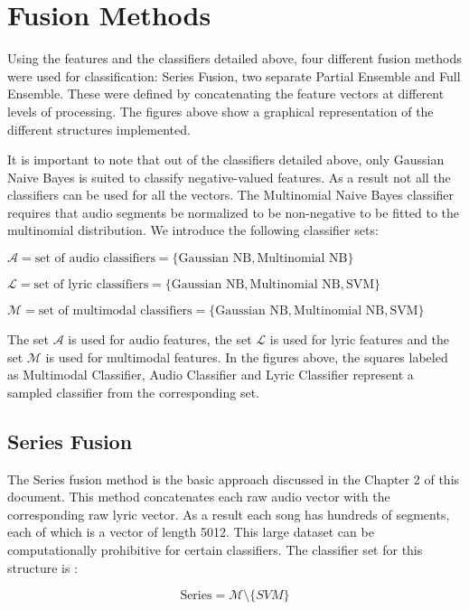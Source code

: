 \section{Fusion Methods}

Using the features and the classifiers detailed above, four different fusion methods were used for 
classification: Series Fusion, two separate Partial Ensemble and Full Ensemble. These were defined by
concatenating the feature vectors at different levels of processing.  The figures above show a graphical 
representation of the different structures implemented.  

It is important to note that out of the classifiers detailed above, only Gaussian Naive Bayes is suited to classify 
negative-valued features. As a result not all the classifiers can be used for all the vectors.   The Multinomial Naive Bayes
classifier requires that audio segments be normalized to be non-negative to be fitted to the multinomial distribution. We introduce the
following classifier sets:

$ \mathcal{A} = \text{set of audio classifiers} = \{ \text{Gaussian NB}, \text{Multinomial NB}\} $

$ \mathcal{L} = \text{set of lyric classifiers} = \{ \text{Gaussian NB}, \text{Multinomial NB}, \text{SVM}\} $

$ \mathcal{M} = \text{set of multimodal classifiers} = \{\text{Gaussian NB}, \text{Multinomial NB}, \text{SVM}\} $


The set $\mathcal{A} $ is used for audio features, the set $\mathcal{L}$ is used 
for lyric features and the set $\mathcal{M}$ is used for multimodal features.  In the figures above, the squares labeled as
Multimodal Classifier, Audio Classifier and Lyric Classifier represent a sampled classifier from the corresponding set.

\subsection{Series Fusion}

The Series fusion method is the basic approach discussed in the Chapter 2 of this document. This
method concatenates each raw audio vector with the corresponding raw lyric vector. As a result each song has hundreds of segments,
each of which is a vector of length 5012.  This large dataset can be computationally prohibitive for certain classifiers. 
 The classifier set for this structure is : 

\[ \text{Series} = \mathcal{M} \setminus \{ SVM\} \]

